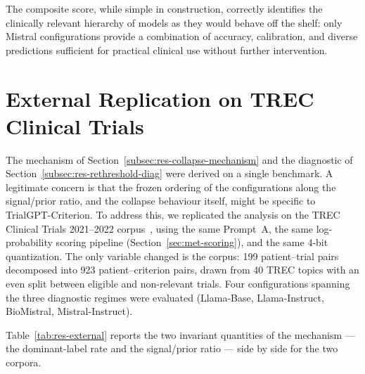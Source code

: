 The composite score, while simple in construction, correctly identifies 
the clinically relevant hierarchy of models as they would behave off the 
shelf: only Mistral configurations provide a combination of accuracy, 
calibration, and diverse predictions sufficient for practical clinical 
use without further intervention.
\section{External Replication on TREC Clinical Trials}
\label{sec:res-external}

The mechanism of Section~\ref{subsec:res-collapse-mechanism} and the 
diagnostic of Section~\ref{subsec:res-rethreshold-diag} were derived on a 
single benchmark. A legitimate concern is that the frozen ordering of the 
configurations along the signal/prior ratio, and the collapse behaviour 
itself, might be specific to TrialGPT-Criterion. To address this, we 
replicated the analysis on the TREC Clinical Trials 2021--2022 corpus~\cite{roberts2021trec, roberts2022trec}, 
using the same Prompt~A, the same log-probability scoring pipeline 
(Section~\ref{sec:met-scoring}), and the same 4-bit quantization. The 
only variable changed is the corpus: 199 patient--trial pairs decomposed 
into 923 patient--criterion pairs, drawn from 40 TREC topics with an 
even split between eligible and non-relevant trials. Four configurations 
spanning the three diagnostic regimes were evaluated 
(Llama-Base, Llama-Instruct, BioMistral, Mistral-Instruct).

Table~\ref{tab:res-external} reports the two invariant quantities of the 
mechanism --- the dominant-label rate and the signal/prior ratio --- 
side by side for the two corpora.

